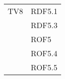 \begin{center}
\begin{longtable}{|p{7cm}|p{7cm}|}
\midrule
TV8
& RDF5.1\\
& RDF5.3\\
& ROF5\\
& ROF5.4\\
& ROF5.5\\

\end{longtable}
\end{center}

